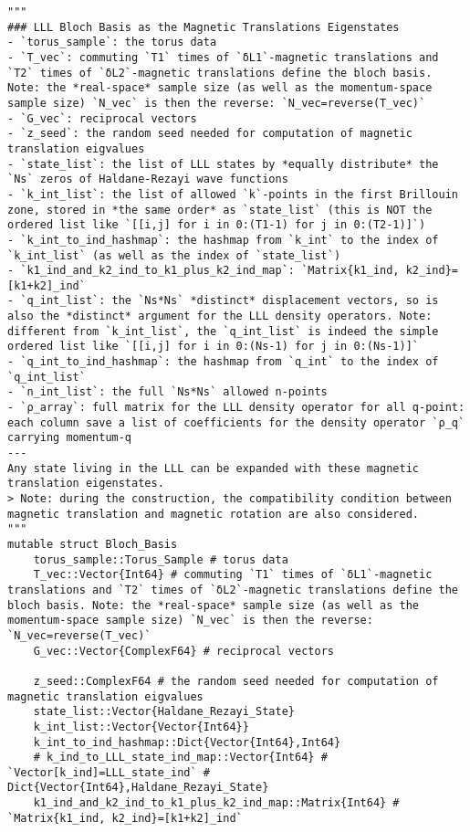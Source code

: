 \begin{verbatim}
"""
### LLL Bloch Basis as the Magnetic Translations Eigenstates
- `torus_sample`: the torus data
- `T_vec`: commuting `T1` times of `δL1`-magnetic translations and `T2` times of `δL2`-magnetic translations define the bloch basis. Note: the *real-space* sample size (as well as the momentum-space sample size) `N_vec` is then the reverse: `N_vec=reverse(T_vec)`
- `G_vec`: reciprocal vectors
- `z_seed`: the random seed needed for computation of magnetic translation eigvalues
- `state_list`: the list of LLL states by *equally distribute* the `Ns` zeros of Haldane-Rezayi wave functions
- `k_int_list`: the list of allowed `k`-points in the first Brillouin zone, stored in *the same order* as `state_list` (this is NOT the ordered list like `[[i,j] for i in 0:(T1-1) for j in 0:(T2-1)]`)
- `k_int_to_ind_hashmap`: the hashmap from `k_int` to the index of `k_int_list` (as well as the index of `state_list`)
- `k1_ind_and_k2_ind_to_k1_plus_k2_ind_map`: `Matrix{k1_ind, k2_ind}=[k1+k2]_ind`
- `q_int_list`: the `Ns*Ns` *distinct* displacement vectors, so is also the *distinct* argument for the LLL density operators. Note: different from `k_int_list`, the `q_int_list` is indeed the simple ordered list like `[[i,j] for i in 0:(Ns-1) for j in 0:(Ns-1)]`
- `q_int_to_ind_hashmap`: the hashmap from `q_int` to the index of `q_int_list`
- `n_int_list`: the full `Ns*Ns` allowed n-points
- `ρ_array`: full matrix for the LLL density operator for all q-point: each column save a list of coefficients for the density operator `ρ_q` carrying momentum-q
---
Any state living in the LLL can be expanded with these magnetic translation eigenstates. 
> Note: during the construction, the compatibility condition between magnetic translation and magnetic rotation are also considered.
"""
mutable struct Bloch_Basis
    torus_sample::Torus_Sample # torus data
    T_vec::Vector{Int64} # commuting `T1` times of `δL1`-magnetic translations and `T2` times of `δL2`-magnetic translations define the bloch basis. Note: the *real-space* sample size (as well as the momentum-space sample size) `N_vec` is then the reverse: `N_vec=reverse(T_vec)`
    G_vec::Vector{ComplexF64} # reciprocal vectors

    z_seed::ComplexF64 # the random seed needed for computation of magnetic translation eigvalues
    state_list::Vector{Haldane_Rezayi_State}
    k_int_list::Vector{Vector{Int64}}
    k_int_to_ind_hashmap::Dict{Vector{Int64},Int64}
    # k_ind_to_LLL_state_ind_map::Vector{Int64} # `Vector[k_ind]=LLL_state_ind` # Dict{Vector{Int64},Haldane_Rezayi_State}
    k1_ind_and_k2_ind_to_k1_plus_k2_ind_map::Matrix{Int64} # `Matrix{k1_ind, k2_ind}=[k1+k2]_ind`


\end{verbatim}
